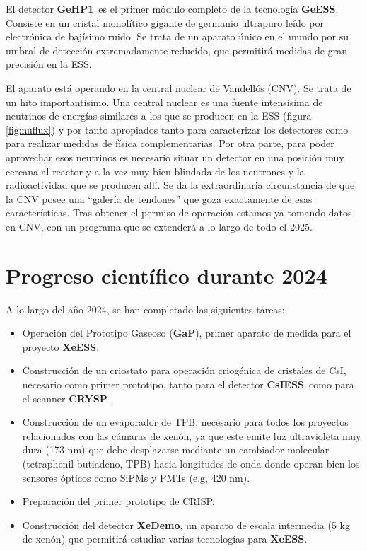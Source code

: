 \documentclass[12pt,a4paper,article]{report} %
\def\xess{{\bf XeESS}}
\def\gess{{\bf GeESS}}
\def\cess{{\bf CsIESS}}
\def\xed{{\bf XeDemo}}
\def\ged{{\bf GeHP1}}
\def\gap{{\bf GaP}}
\def\crysp{{\bf CRYSP }}
\begin{document}
El detector \ged\ es el primer módulo completo de la tecnología \gess. Consiste en un cristal monolítico gigante de germanio ultrapuro leído por electrónica de bajísimo ruido. Se trata de un aparato único en el mundo por su umbral de detección extremadamente reducido, que permitirá medidas de gran precisión en la ESS.


El aparato está operando en la central nuclear de Vandellós (CNV). Se trata de un hito importantísimo. Una central nuclear es una fuente intensísima de neutrinos de energías similares a los que se producen en la ESS (figura \ref{fig:nuflux}) y por tanto apropiados tanto para caracterizar los detectores como para realizar medidas de física complementarias. Por otra parte, para poder aprovechar esos neutrinos es necesario situar un detector en una posición muy cercana al reactor y a la vez muy bien blindada de los neutrones y la radioactividad que se producen allí. Se da la extraordinaria circunstancia de que la CNV posee una ``galería de tendones'' que goza exactamente de esas características.  Tras obtener el permiso de operación estamos ya tomando datos en CNV, con un programa que se extenderá a lo largo de todo el 2025.


\section*{Progreso científico durante 2024}

A lo largo del año 2024, se han completado las siguientes tareas:
\begin{itemize}
\item Operación del Prototipo Gaseoso (\gap), primer aparato de medida para el proyecto \xess.
\item Construcción de un criostato para operación criogénica de cristales de CsI, necesario como primer prototipo, tanto para el detector  \cess\ como para el scanner \crysp.
\item Construcción de un evaporador de TPB, necesario para todos los proyectos relacionados con las cámaras de xenón, ya que este emite luz ultravioleta muy dura (173 nm) que debe desplazarse mediante un cambiador molecular (tetraphenil-butiadeno, TPB) hacia longitudes de onda donde operan bien los sensores ópticos como SiPMs y PMTs (e.g, 420 nm).
\item Preparación del primer prototipo de CRISP. 
\item Construcción del detector \xed, un aparato de escala intermedia (5 kg de xenón) que permitirá estudiar varias tecnologías para \xess.  
 
\end{itemize}
\end{document}
